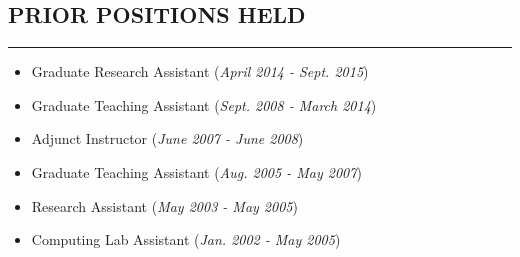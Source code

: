 \documentclass[10pt,a4]{article}
\begin{document}
\subsection*{PRIOR POSITIONS HELD}
\hrule  height 4pt
\vspace{0.2cm}




\begin{itemize}
    \item Graduate Research Assistant ({\it April 2014 - Sept. 2015}) \\
    \item Graduate Teaching Assistant ({\it Sept. 2008 - March 2014}) \\
    \item Adjunct Instructor ({\it June 2007 - June 2008}) \\
    \item Graduate Teaching Assistant ({\it Aug. 2005 - May 2007}) \\
    \item Research Assistant ({\it May 2003 - May 2005}) \\
    \item Computing Lab Assistant ({\it Jan. 2002 - May 2005}) \\
\end{itemize}

\end{document}
